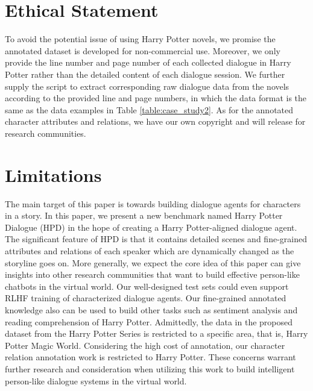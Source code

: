\documentclass[11pt]{article}
\begin{document}
%
 \section*{Ethical Statement}
To avoid the potential issue of using Harry Potter novels, we promise the annotated dataset is developed for non-commercial use. Moreover, we only provide the line number and page number of each collected dialogue in Harry Potter rather than the detailed content of each dialogue session.  We further supply the script to extract corresponding raw dialogue data from the novels according to the provided line and page numbers, in which the data format is the same as the data examples in Table \ref{table:case_study2}. As for the annotated character attributes and relations, we have our own copyright and will release for research communities.



\section*{Limitations}
The main target of this paper is towards building dialogue agents for characters in a story. In this paper, we present a new benchmark named Harry Potter Dialogue (HPD) in the hope of creating a Harry Potter-aligned dialogue agent. The significant feature of HPD is that it contains detailed scenes and fine-grained attributes and relations of each speaker which are dynamically changed as the storyline goes on. 
More generally, we expect the core idea of this paper can give insights into other research communities that want to build effective person-like chatbots in the virtual world.  Our well-designed test sets  could even support RLHF training of characterized dialogue agents.
Our fine-grained annotated knowledge also can be used to build other tasks such as sentiment analysis and reading comprehension of Harry Potter.
Admittedly, the data in the proposed dataset from the Harry Potter Series is restricted to a specific area, that is, Harry Potter Magic World. Considering the high cost of annotation, our character relation annotation work is restricted to Harry Potter.
 These concerns warrant further research and consideration when utilizing this work to build intelligent person-like dialogue systems in the virtual world.






\clearpage
\appendix
\end{document}
